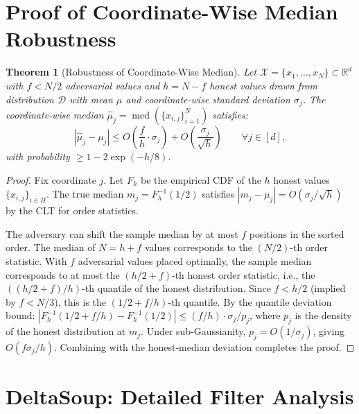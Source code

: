 \documentclass[11pt]{article}
\newtheorem{theorem}{Theorem}
\DeclareMathOperator{\med}{med}
\begin{document}
\appendix

\section{Proof of Coordinate-Wise Median Robustness}
\label{app:cwmed-proof}

\begin{theorem}[Robustness of Coordinate-Wise Median]
\label{thm:cwmed-robust-full}
Let $\mathcal{X} = \{x_1, \ldots, x_N\} \subset \mathbb{R}^d$ with $f < N/2$
adversarial values and $h = N - f$ honest values drawn from distribution
$\mathcal{D}$ with mean $\mu$ and coordinate-wise standard deviation $\sigma_j$.
The coordinate-wise median $\hat{\mu}_j = \med(\{x_{i,j}\}_{i=1}^N)$ satisfies:
\begin{equation}
    |\hat{\mu}_j - \mu_j| \leq O\!\left(\frac{f}{h} \cdot \sigma_j\right)
    + O\!\left(\frac{\sigma_j}{\sqrt{h}}\right)
    \qquad \forall j \in [d],
\end{equation}
with probability $\geq 1 - 2\exp(-h/8)$.
\end{theorem}

\begin{proof}
Fix coordinate $j$. Let $F_h$ be the empirical CDF of the $h$ honest values
$\{x_{i,j}\}_{i \in H}$. The true median $m_j = F_h^{-1}(1/2)$ satisfies
$|m_j - \mu_j| = O(\sigma_j / \sqrt{h})$ by the CLT for order statistics.

The adversary can shift the sample median by at most $f$ positions in the
sorted order. The median of $N = h + f$ values corresponds to the
$(N/2)$-th order statistic. With $f$ adversarial values placed optimally,
the sample median corresponds to at most the $(h/2 + f)$-th honest order
statistic, i.e., the $((h/2 + f)/h)$-th quantile of the honest distribution.
Since $f < h/2$ (implied by $f < N/3$), this is the $(1/2 + f/h)$-th quantile.
By the quantile deviation bound:
$|F_h^{-1}(1/2 + f/h) - F_h^{-1}(1/2)| \leq (f/h) \cdot \sigma_j / p_j$,
where $p_j$ is the density of the honest distribution at $m_j$. Under
sub-Gaussianity, $p_j = O(1/\sigma_j)$, giving $O(f \sigma_j / h)$.
Combining with the honest-median deviation completes the proof.
\end{proof}

\section{DeltaSoup: Detailed Filter Analysis}
\label{app:filter-analysis}
\end{document}
